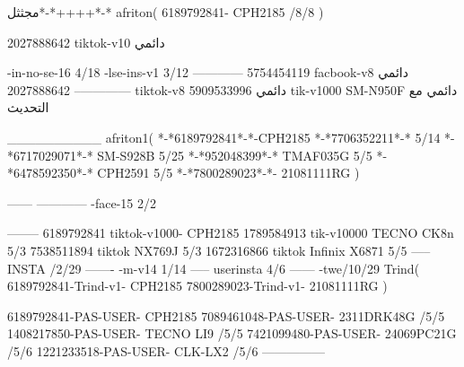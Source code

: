 مجثثل*-*++++*-*
afriton(
6189792841- CPH2185  /8/8
)

2027888642 tiktok-v10
دائمي

-in-no-se-16 4/18
-lse-ins-v1 3/12
------------
5754454119 facbook-v8
دائمي
--------------
2027888642 tiktok-v8
دائمي
5909533996 tik-v1000  SM-N950F
دائمي مع التحديث

__________
afriton1(
*-*6189792841*-*-CPH2185
*-*7706352211*-* 5/14
*-*6717029071*-*  SM-S928B 5/25
*-*952048399*-* TMAF035G 5/5
*-*6478592350*-* CPH2591 5/5
*-*7800289023*-*- 21081111RG \5\7
)


------
------------
-face-15 2/2

--------
6189792841 tiktok-v1000- CPH2185 
1789584913 tik-v10000  TECNO CK8n 5/3
7538511894 tiktok NX769J  5/3
1672316866 tiktok Infinix X6871  5/5
-----
 INSTA /2/29
-------
-m-v14 1/14
-----
userinsta 4/6
------
-twe/10/29
Trind(
6189792841-Trind-v1- CPH2185 
7800289023-Trind-v1- 21081111RG \5\5
)

6189792841-PAS-USER- CPH2185 
7089461048-PAS-USER- 2311DRK48G /5/5
1408217850-PAS-USER- TECNO LI9 /5/5
7421099480-PAS-USER- 24069PC21G /5/6
1221233518-PAS-USER- CLK-LX2 /5/6
    ---------------

